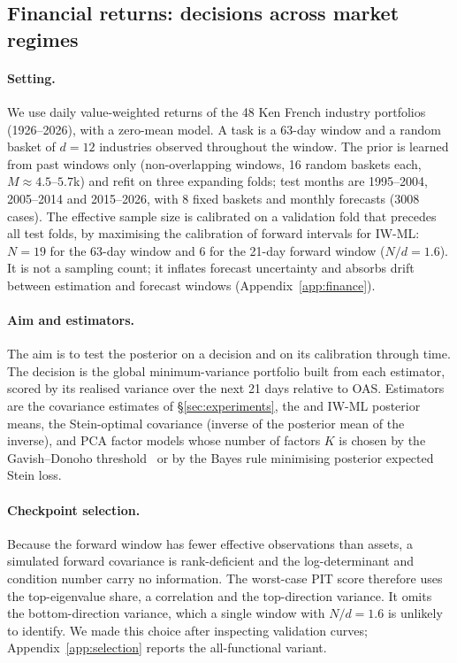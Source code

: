 \subsection{Financial returns: decisions across market regimes}
\label{sec:exp-fin}

\paragraph{Setting.}
We use daily value-weighted returns of the 48 Ken French industry portfolios (1926--2026), with a zero-mean model.
A task is a 63-day window and a random basket of $d{=}12$ industries observed throughout the window.
The prior is learned from past windows only (non-overlapping windows, 16 random baskets each, $M\approx 4.5$--$5.7$k) and refit on three expanding folds; test months are 1995--2004, 2005--2014 and 2015--2026, with 8 fixed baskets and monthly forecasts (3008 cases).
The effective sample size is calibrated on a validation fold that precedes all test folds, by maximising the calibration of forward intervals for IW-ML: $N{=}19$ for the 63-day window and $6$ for the 21-day forward window ($N/d{=}1.6$).
It is not a sampling count; it inflates forecast uncertainty and absorbs drift between estimation and forecast windows (Appendix~\ref{app:finance}).

\paragraph{Aim and estimators.}
The aim is to test the posterior on a decision and on its calibration through time.
The decision is the global minimum-variance portfolio built from each estimator, scored by its realised variance over the next 21 days relative to OAS.
Estimators are the covariance estimates of \S\ref{sec:experiments}, the \scsi{} and IW-ML posterior means, the \scsi{} Stein-optimal covariance (inverse of the posterior mean of the inverse), and PCA factor models whose number of factors $K$ is chosen by the Gavish--Donoho threshold~\citep{gavish2014optimal} or by the Bayes rule minimising posterior expected Stein loss.

\paragraph{Checkpoint selection.}
Because the forward window has fewer effective observations than assets, a simulated forward covariance is rank-deficient and the log-determinant and condition number carry no information.
The worst-case PIT score therefore uses the top-eigenvalue share, a correlation and the top-direction variance.
It omits the bottom-direction variance, which a single window with $N/d{=}1.6$ is unlikely to identify.
We made this choice after inspecting validation curves; Appendix~\ref{app:selection} reports the all-functional variant.

